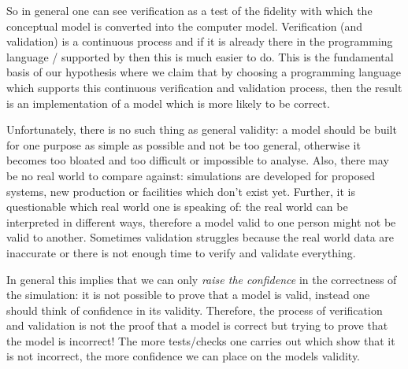 
So in general one can see verification as a test of the fidelity with which the conceptual model is converted into the computer model. Verification (and validation) is a continuous process and if it is already there in the programming language / supported by then this is much easier to do. This is the fundamental basis of our hypothesis where we claim that by choosing a programming language which supports this continuous verification and validation process, then the result is an implementation of a model which is more likely to be correct.

Unfortunately, there is no such thing as general validity: a model should be built for one purpose as simple as possible and not be too general, otherwise it becomes too bloated and too difficult or impossible to analyse. Also, there may be no real world to compare against: simulations are developed for proposed systems, new production or facilities which don't exist yet. Further, it is questionable which real world one is speaking of: the real world can be interpreted in different ways, therefore a model valid to one person might not be valid to another. Sometimes validation struggles because the real world data are inaccurate or there is not enough time to verify and validate everything.

In general this implies that we can only \textit{raise the confidence} in the correctness of the simulation: it is not possible to prove that a model is valid, instead one should think of confidence in its validity. Therefore, the process of verification and validation is not the proof that a model is correct but trying to prove that the model is incorrect! The more tests/checks one carries out which show that it is not incorrect, the more confidence we can place on the models validity.

%		
%		

